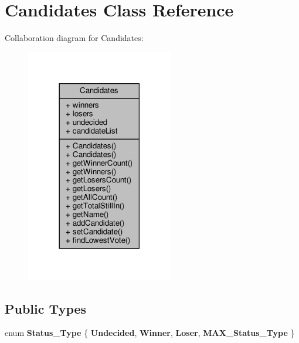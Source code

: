 \hypertarget{classCandidates}{}\section{Candidates Class Reference}
\label{classCandidates}


Collaboration diagram for Candidates\+:
\nopagebreak
\begin{figure}[H]
\begin{center}
\leavevmode
\includegraphics[width=182pt]{classCandidates__coll__graph}
\end{center}
\end{figure}
\subsection*{Public Types}
\begin{DoxyCompactItemize}
\item 
\mbox{\label{classCandidates_affbd141eaea1fb26ce3e7162414c6594}} 
enum {\bfseries Status\+\_\+\+Type} \{ {\bfseries Undecided}, 
{\bfseries Winner}, 
{\bfseries Loser}, 
{\bfseries M\+A\+X\+\_\+\+Status\+\_\+\+Type}
 \}
\end{DoxyCompactItemize}
